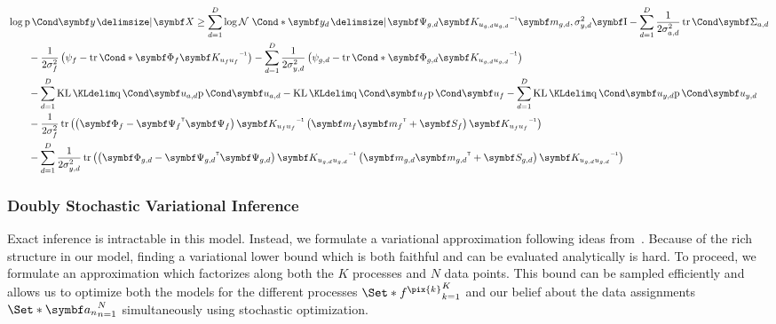\begin{align}
    \label{eq:var_compression:full_bound}
    \begin{split}
        \MoveEqLeft\log \Prob{\rv{y}\given \mat{X}} \geq
        \sum_{d=1}^D \log\Gaussian*{\rv{y_d} \given \mat{\Psi_{g, d}} \mat{K_{u_{g, d}u_{g, d}}}\inv \mat{m_{g, d}}, \sigma_{y, d}^2 \Eye}
        - \sum_{d=1}^D \frac{1}{2\sigma_{a, d}^2} \Fun{\tr}{\mat{\Sigma_{a, d}}} \\
        &- \frac{1}{2\sigma_f^2} \left( \psi_{f} - \Fun*{\tr}{\mat{\Phi_f} \mat{K_{u_fu_f}}\inv} \right)
        - \sum_{d=1}^D\frac{1}{2\sigma_{y, d}^2} \left( \psi_{g, d} - \Fun*\tr{\mat{\Phi_{g, d}} \mat{K_{u_{g, d}u_{g, d}}}\inv} \right) \\
        &- \sum_{d=1}^D \KL{\Variat{\rv{u_{a, d}}}}{\Prob{\rv{u_{a, d}}}}
        - \KL{\Variat{\rv{u_f}}}{\Prob{\rv{u_f}}}
        - \sum_{d=1}^D \KL{\Variat{\rv{u_{y, d}}}}{\Prob{\rv{u_{y, d}}}} \\
        &- \frac{1}{2\sigma_f^2} \tr\left(\left(\mat{\Phi_f} - \mat{\Psi_f}\tran\mat{\Psi_f}\right) \mat{K_{u_fu_f}}\inv \left(\mat{m_f}\mat{m_f}\tran + \mat{S_f}\right)\mat{K_{u_fu_f}}\inv\right) \\
        &- \sum_{d=1}^D\frac{1}{2\sigma_{y, d}^2} \tr\left(\left(\mat{\Phi_{g, d}} - \mat{\Psi_{g, d}}\tran\mat{\Psi_{g, d}}\right)
        \mat{K_{u_{g, d}u_{g, d}}}\inv \left(\mat{m_{g, d}}\mat{m_{g, d}}\tran + \mat{S_{g, d}}\right) \mat{K_{u_{g, d}u_{g, d}}}\inv\right)
    \end{split}
\end{align}


\subsubsection{Doubly Stochastic Variational Inference}
\label{toc:dsvi}
Exact inference is intractable in this model.
Instead, we formulate a variational approximation following ideas from~\parencite{hensman_gaussian_2013, salimbeni_doubly_2017}.
Because of the rich structure in our model, finding a variational lower bound which is both faithful and can be evaluated analytically is hard.
To proceed, we formulate an approximation which factorizes along both the $K$ processes and $N$ data points.
This bound can be sampled efficiently and allows us to optimize both the models for the different processes $\Set*{f^{\pix{k}}}_{k=1}^K$ and our belief about the data assignments $\Set*{\mat{a_n}}_{n=1}^N$ simultaneously using stochastic optimization.

